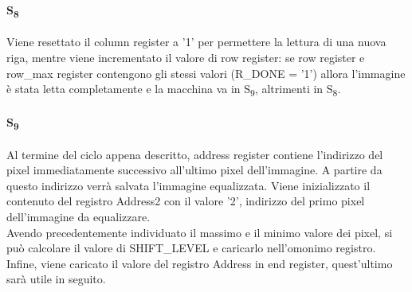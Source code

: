 \paragraph{S\textsubscript{8}}
Viene resettato il column register a '1' per permettere la lettura di una nuova riga, mentre viene incrementato il valore di row register: se row register e row\_max register contengono gli stessi valori (R\_DONE = '1') allora l'immagine è stata letta completamente e la macchina va in S\textsubscript{9}, altrimenti in S\textsubscript{8}.

\paragraph{S\textsubscript{9}}
Al termine del ciclo appena descritto, address register contiene l'indirizzo del pixel immediatamente successivo all'ultimo pixel dell'immagine. A partire da questo indirizzo verrà salvata l'immagine equalizzata.
Viene inizializzato il contenuto del registro Address2 con il valore '2', indirizzo del primo pixel dell'immagine da equalizzare.\\
Avendo precedentemente individuato il massimo e il minimo valore dei pixel, si può calcolare %
il valore di SHIFT\_LEVEL e caricarlo nell'omonimo registro.
Infine, viene caricato il valore del registro Address in end register, quest'ultimo sarà utile in seguito.
